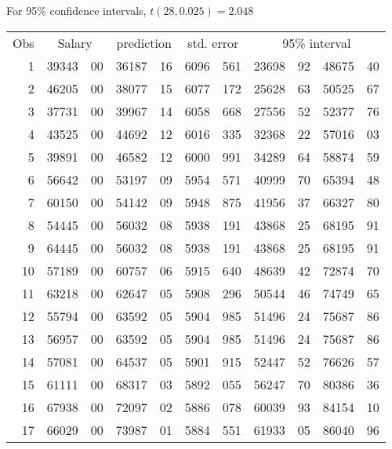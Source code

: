 \documentclass[11pt]{article}
\begin{document}
\thispagestyle{empty}

\begin{center}
For 95\% confidence intervals, $t(28, 0.025) = 2.048$

\end{center}

\begin{center}
\begin{longtable}{%
r%
  r@{.}l%
    r@{.}l%
      r@{.}l%
        r@{.}l%
         r@{.}l}%
Obs & \multicolumn{2}{c}{Salary}  & \multicolumn{2}{c}{prediction}
  & \multicolumn{2}{c}{std. error}
   & \multicolumn{4}{c}{95\% interval} \\[1ex]
       1  & 39343&00 & 36187&16 & 6096&561 & 23698&92 & 48675&40 \\
       2  & 46205&00 & 38077&15 & 6077&172 & 25628&63 & 50525&67 \\
       3  & 37731&00 & 39967&14 & 6058&668 & 27556&52 & 52377&76 \\
       4  & 43525&00 & 44692&12 & 6016&335 & 32368&22 & 57016&03 \\
       5  & 39891&00 & 46582&12 & 6000&991 & 34289&64 & 58874&59 \\
       6  & 56642&00 & 53197&09 & 5954&571 & 40999&70 & 65394&48 \\
       7  & 60150&00 & 54142&09 & 5948&875 & 41956&37 & 66327&80 \\
       8  & 54445&00 & 56032&08 & 5938&191 & 43868&25 & 68195&91 \\
       9  & 64445&00 & 56032&08 & 5938&191 & 43868&25 & 68195&91 \\
      10  & 57189&00 & 60757&06 & 5915&640 & 48639&42 & 72874&70 \\
      11  & 63218&00 & 62647&05 & 5908&296 & 50544&46 & 74749&65 \\
      12  & 55794&00 & 63592&05 & 5904&985 & 51496&24 & 75687&86 \\
      13  & 56957&00 & 63592&05 & 5904&985 & 51496&24 & 75687&86 \\
      14  & 57081&00 & 64537&05 & 5901&915 & 52447&52 & 76626&57 \\
      15  & 61111&00 & 68317&03 & 5892&055 & 56247&70 & 80386&36 \\
      16  & 67938&00 & 72097&02 & 5886&078 & 60039&93 & 84154&10 \\
      17  & 66029&00 & 73987&01 & 5884&551 & 61933&05 & 86040&96 \\

\end{longtable}
\end{center}
\end{document}
